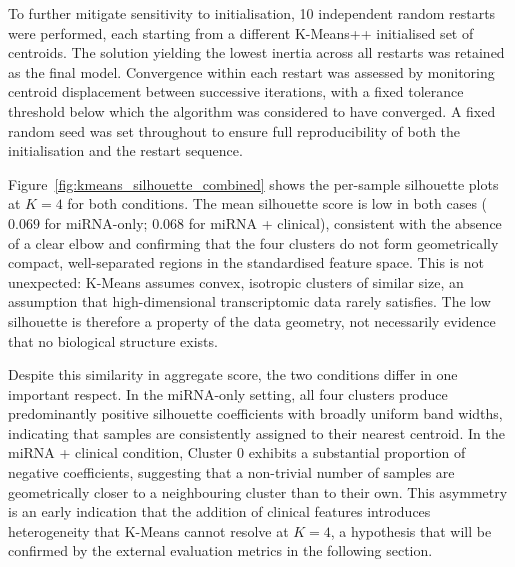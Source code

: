 To further mitigate sensitivity to initialisation, 10 independent random restarts were
performed, each starting from a different K-Means++ initialised set of centroids. The
solution yielding the lowest inertia across all restarts was retained as the final model.
Convergence within each restart was assessed by monitoring centroid displacement between
successive iterations, with a fixed tolerance threshold below which the algorithm was
considered to have converged. A fixed random seed was set throughout to ensure full
reproducibility of both the initialisation and the restart sequence.

Figure~\ref{fig:kmeans_silhouette_combined} shows the per-sample silhouette plots at
$K = 4$ for both conditions. The mean silhouette score is low in both cases ($0.069$
for miRNA-only; $0.068$ for miRNA + clinical), consistent with the absence of a clear
elbow and confirming that the four clusters do not form geometrically compact,
well-separated regions in the standardised feature space. This is not unexpected: K-Means
assumes convex, isotropic clusters of similar size, an assumption that high-dimensional
transcriptomic data rarely satisfies. The low silhouette is therefore a property of the
data geometry, not necessarily evidence that no biological structure exists.

Despite this similarity in aggregate score, the two conditions differ in one important
respect. In the miRNA-only setting, all four clusters produce predominantly positive
silhouette coefficients with broadly uniform band widths, indicating that samples are
consistently assigned to their nearest centroid. In the miRNA +
clinical condition, Cluster 0 exhibits a substantial proportion of negative coefficients,
suggesting that a non-trivial number of samples are geometrically closer to a
neighbouring cluster than to their own. This asymmetry is an early indication that the
addition of clinical features introduces heterogeneity that K-Means cannot resolve at
$K = 4$, a hypothesis that will be confirmed by the external evaluation metrics in the
following section.

